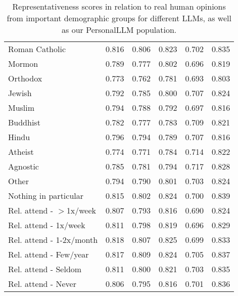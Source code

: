 \begin{table}[!ht]
\begin{tabular}{lccccc}
Roman Catholic & 0.816 & 0.806 & 0.823 & 0.702 & 0.835 \\
Mormon & 0.789 & 0.777 & 0.802 & 0.696 & 0.819 \\
Orthodox & 0.773 & 0.762 & 0.781 & 0.693 & 0.803 \\
Jewish & 0.792 & 0.785 & 0.800 & 0.707 & 0.824 \\
Muslim & 0.794 & 0.788 & 0.792 & 0.697 & 0.816 \\
Buddhist & 0.782 & 0.777 & 0.783 & 0.709 & 0.821 \\
Hindu & 0.796 & 0.794 & 0.789 & 0.707 & 0.816 \\
Atheist & 0.774 & 0.771 & 0.784 & 0.714 & 0.822 \\
Agnostic & 0.785 & 0.781 & 0.794 & 0.717 & 0.828 \\
Other & 0.794 & 0.790 & 0.801 & 0.703 & 0.824 \\
Nothing in particular & 0.815 & 0.802 & 0.824 & 0.700 & 0.839 \\
Rel. attend - $>$1x/week & 0.807 & 0.793 & 0.816 & 0.690 & 0.824 \\
Rel. attend - 1x/week & 0.811 & 0.798 & 0.819 & 0.696 & 0.829 \\
Rel. attend - 1-2x/month & 0.818 & 0.807 & 0.825 & 0.699 & 0.833 \\
Rel. attend - Few/year & 0.817 & 0.809 & 0.824 & 0.705 & 0.837 \\
Rel. attend - Seldom & 0.811 & 0.800 & 0.821 & 0.703 & 0.835 \\
Rel. attend - Never & 0.806 & 0.795 & 0.816 & 0.701 & 0.836 \\
    \bottomrule
    \end{tabular}
    \caption{Representativeness scores in relation to real human opinions from important demographic groups for different LLMs, as well as our \textsf{PersonalLLM} population.}
    \label{tab:opinion_qa_full}
\end{table}

